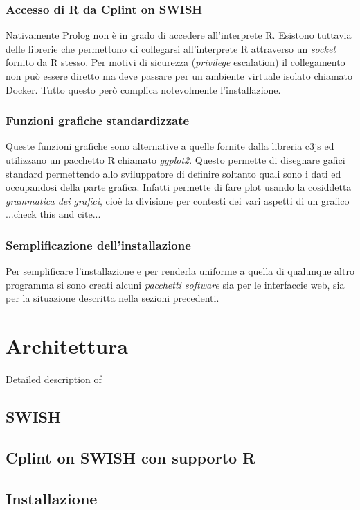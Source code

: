 \documentclass[10pt,titlepage,twoside,a4paper]{report}
\begin{document}
        \subsection{Accesso di R da Cplint on SWISH}
Nativamente Prolog non è in grado di accedere all'interprete R. Esistono 
tuttavia delle librerie che permettono di collegarsi all'interprete R
attraverso un \emph{socket} fornito da R stesso. Per motivi di sicurezza 
(\emph{privilege} escalation) il collegamento non può essere diretto ma deve 
passare per un ambiente virtuale isolato chiamato Docker. Tutto questo però 
complica notevolmente l'installazione.

        \subsection{Funzioni grafiche standardizzate}
Queste funzioni grafiche sono alternative a quelle fornite dalla libreria c3js 
ed utilizzano un pacchetto R chiamato \emph{ggplot2}. Questo permette di 
disegnare gafici standard permettendo allo sviluppatore di definire soltanto 
quali sono i dati ed occupandosi della parte grafica. Infatti permette di fare 
plot usando la cosiddetta \emph{grammatica dei grafici}, cioè la divisione per 
contesti dei vari aspetti di un grafico ...check this and cite...

        \subsection{Semplificazione dell'installazione}
Per semplificare l'installazione e per renderla uniforme a quella di qualunque 
altro programma si sono creati alcuni \emph{pacchetti software} sia per 
le interfaccie web, sia per la situazione descritta nella sezioni precedenti.




\chapter{Architettura}
Detailed description of
    \section{SWISH}
    \section{Cplint on SWISH con supporto R}
    \section{Installazione}
\end{document}
